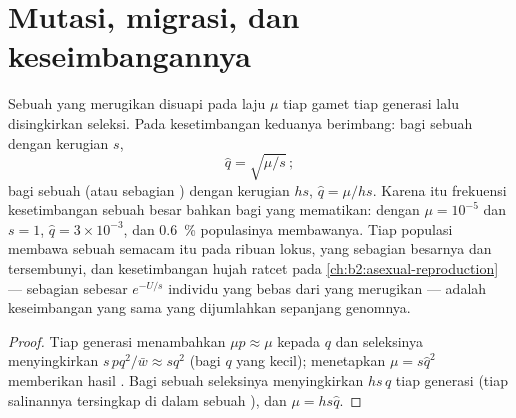 \section{Mutasi, migrasi, dan keseimbangannya}

\begin{theorem}\label{thm:b2:population-genetics:balance}
Sebuah  yang merugikan disuapi  pada laju $\mu$ tiap gamet
tiap generasi lalu disingkirkan seleksi. Pada kesetimbangan keduanya
berimbang: bagi sebuah   dengan kerugian  $s$,
\[
\hat q = \sqrt{\mu/s}\,;
\]
bagi sebuah   (atau sebagian ) dengan kerugian
 $hs$, $\hat q = \mu/hs$. Karena itu frekuensi kesetimbangan
sebuah   besar bahkan bagi yang mematikan: dengan $\mu = 10^{-5}$ dan $s = 1$, $\hat q = 3\times 10^{-3}$, dan \qty{0.6}{\%}
populasinya membawanya. Tiap populasi membawa sebuah \emph{} semacam itu pada ribuan lokus, yang sebagian besarnya 
dan tersembunyi, dan kesetimbangan hujah ratcet pada
\cref{ch:b2:asexual-reproduction} --- sebagian sebesar $e^{-U/s}$
individu yang bebas dari  yang merugikan --- adalah keseimbangan
yang sama yang dijumlahkan sepanjang genomnya.
\end{theorem}
\begin{proof}
Tiap generasi  menambahkan $\mu p \approx \mu$ kepada $q$ dan
seleksinya menyingkirkan $s\,pq^{2}/\bar w \approx sq^{2}$ (bagi $q$
yang kecil); menetapkan $\mu = s\hat q^{2}$ memberikan hasil
. Bagi sebuah   seleksinya menyingkirkan $hs\,q$
tiap generasi (tiap salinannya tersingkap di dalam sebuah ),
dan $\mu = hs\hat q$.
\end{proof}


